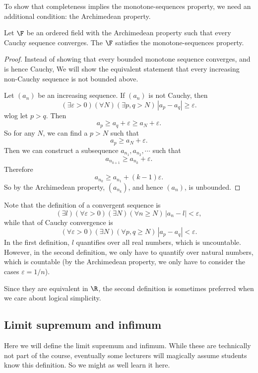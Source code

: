 \documentclass[a4paper]{article}
\begin{document}
To show that completeness implies the monotone-sequences property, we need an additional condition: the Archimedean property.

\begin{lemma}
  Let $\F$ be an ordered field with the Archimedean property such that every Cauchy sequence converges. The $\F$ satisfies the monotone-sequences property.
\end{lemma}

\begin{proof}
  Instead of showing that every bounded monotone sequence converges, and is hence Cauchy, We will show the equivalent statement that every increasing non-Cauchy sequence is not bounded above.

  Let $(a_n)$ be an increasing sequence. If $(a_n)$ is not Cauchy, then
  \[
    (\exists \varepsilon > 0)(\forall N)(\exists p, q > N)\,|a_p - a_q| \geq \varepsilon.
  \]
  wlog let $p > q$. Then
  \[
    a_p \geq a_q + \varepsilon \geq a_N + \varepsilon.
  \]
  So for any $N$, we can find a $p > N$ such that
  \[
    a_p \geq a_N + \varepsilon.
  \]
  Then we can construct a subsequence $a_{n_1}, a_{n_2}, \cdots$ such that
  \[
    a_{n_{k + 1}} \geq a_{n_k} + \varepsilon.
  \]
  Therefore
  \[
    a_{n_k} \geq a_{n_1} + (k - 1)\varepsilon.
  \]
  So by the Archimedean property, $(a_{n_k})$, and hence $(a_n)$, is unbounded.
\end{proof}

Note that the definition of a convergent sequence is
\[
  (\exists l)(\forall \varepsilon > 0)(\exists N)(\forall n\geq N)\, |a_n - l| < \varepsilon,
\]
while that of Cauchy convergence is
\[
  (\forall \varepsilon > 0)(\exists N)(\forall p, q\geq N)\, |a_p - a_q| < \varepsilon.
\]
In the first definition, $l$ quantifies over all real numbers, which is uncountable. However, in the second definition, we only have to quantify over natural numbers, which is countable (by the Archimedean property, we only have to consider the cases $\varepsilon = 1/n$).

Since they are equivalent in $\R$, the second definition is sometimes preferred when we care about logical simplicity.

\subsection{Limit supremum and infimum}
Here we will define the limit supremum and infimum. While these are technically not part of the course, eventually some lecturers will magically assume students know this definition. So we might as well learn it here.
\end{document}
